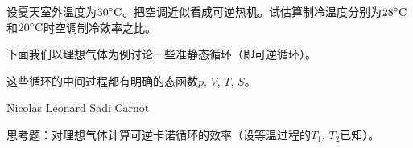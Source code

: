 \documentclass[CJK]{beamer}
\begin{document}
\begin{frame}
\bch


设夏天室外温度为$30^\circ \mathrm{C}$。把空调近似看成可逆热机。试估算制冷温度分别为$28^\circ \mathrm{C}$和$20^\circ \mathrm{C}$时空调制冷效率之比。

\ech
\end{frame}

\begin{frame}
\bch
下面我们以理想气体为例讨论一些准静态循环（即可逆循环）。

\skipline

这些循环的中间过程都有明确的态函数$p$, $V$, $T$, $S$。
\ech
\end{frame}

\begin{frame}
\bch
{}
\ech
\end{frame}

\begin{frame}
\bch
{}
\ech
\end{frame}


\begin{frame}
\bch
{}
\ech
\end{frame}

\begin{frame}
\bch
{}
\ech
\end{frame}

\begin{frame}
\bch

\bcenter
Nicolas Léonard Sadi Carnot
\ecenter
\ech
\end{frame}


\begin{frame}
\bch


\ech
\end{frame}

\begin{frame}
\bch
{}

思考题：对理想气体计算可逆卡诺循环的效率（设等温过程的$T_1$, $T_2$已知）。
\ech
\end{frame}
\end{document}
